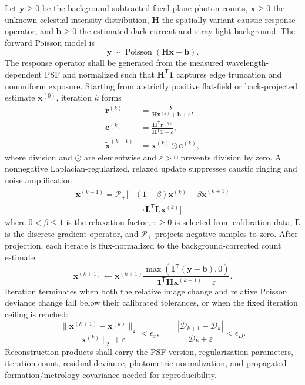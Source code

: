 \documentclass[10pt,twocolumn]{IEEEtran}
\begin{document}
Let $\bm y\geq0$ be the background-subtracted focal-plane photon counts, $\bm x\geq0$ the unknown celestial intensity distribution, $\bm H$ the spatially variant caustic-response operator, and $\bm b\geq0$ the estimated dark-current and stray-light background.  The forward Poisson model is
\begin{equation}
\bm y\sim\operatorname{Poisson}\!\left(\bm H\bm x+\bm b\right).
\label{eq:poisson_caustic_model}
\end{equation}
The response operator shall be generated from the measured wavelength-dependent PSF and normalized such that $\bm H^{\mathsf T}\bm 1$ captures edge truncation and nonuniform exposure.  Starting from a strictly positive flat-field or back-projected estimate $\bm x^{(0)}$, iteration $k$ forms
\begin{equation}
\begin{aligned}
\bm r^{(k)}
&=\frac{\bm y}{\bm H\bm x^{(k)}+\bm b+\varepsilon}, \\
\bm c^{(k)}
&=\frac{\bm H^{\mathsf T}\bm r^{(k)}}
{\bm H^{\mathsf T}\bm 1+\varepsilon}, \\
\widetilde{\bm x}^{(k+1)}
&=\bm x^{(k)}\odot\bm c^{(k)},
\end{aligned}
\label{eq:modified_rl_core}
\end{equation}
where division and $\odot$ are elementwise and $\varepsilon>0$ prevents division by zero.  A nonnegative Laplacian-regularized, relaxed update suppresses caustic ringing and noise amplification:
\begin{equation}
\begin{aligned}
\bm x^{(k+1)}=\mathcal P_+\!\bigl[&
(1-\beta)\bm x^{(k)}+\beta\widetilde{\bm x}^{(k+1)}\\
&-\tau\bm L^{\mathsf T}\bm L\bm x^{(k)}\bigr],
\end{aligned}
\label{eq:regularized_rl_update}
\end{equation}
where $0<\beta\leq1$ is the relaxation factor, $\tau\geq0$ is selected from calibration data, $\bm L$ is the discrete gradient operator, and $\mathcal P_+$ projects negative samples to zero.  After projection, each iterate is flux-normalized to the background-corrected count estimate:
\begin{equation}
\bm x^{(k+1)}\leftarrow
\bm x^{(k+1)}
\frac{\max\!\left(\bm 1^{\mathsf T}(\bm y-\bm b),0\right)}
{\bm 1^{\mathsf T}\bm H\bm x^{(k+1)}+\varepsilon}.
\label{eq:rl_flux_normalization}
\end{equation}
Iteration terminates when both the relative image change and relative Poisson deviance change fall below their calibrated tolerances, or when the fixed iteration ceiling is reached:
\begin{equation}
\frac{\|\bm x^{(k+1)}-\bm x^{(k)}\|_2}
{\|\bm x^{(k)}\|_2+\varepsilon}<\epsilon_x,
\qquad
\frac{|\mathcal D_{k+1}-\mathcal D_k|}
{\mathcal D_k+\varepsilon}<\epsilon_D.
\label{eq:rl_stopping_rule}
\end{equation}
Reconstruction products shall carry the PSF version, regularization parameters, iteration count, residual deviance, photometric normalization, and propagated formation/metrology covariance needed for reproducibility.
\end{document}
